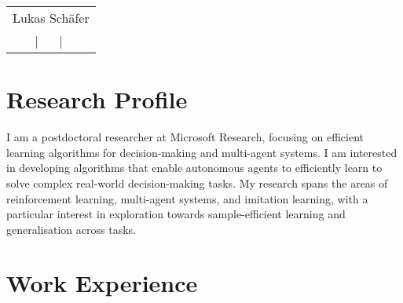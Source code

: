 \documentclass[a4paper,12pt]{article}
\begin{document}
\nocite{*}

\pagestyle{empty} 



\begin{tabularx}{\linewidth}{@{} C @{}}
\Huge{Lukas Sch\"afer} \\[7.5pt]
 \ $|$ \
 \ $|$ \
 \\
\end{tabularx}

\section{Research Profile}
I am a postdoctoral researcher at Microsoft Research, focusing on efficient learning algorithms for decision-making and multi-agent systems. I am interested in developing algorithms that enable autonomous agents to efficiently learn to solve complex real-world decision-making tasks. My research spans the areas of reinforcement learning, multi-agent systems, and imitation learning, with a particular interest in exploration towards sample-efficient learning and generalisation across tasks.


\section{Work Experience}
\end{document}
